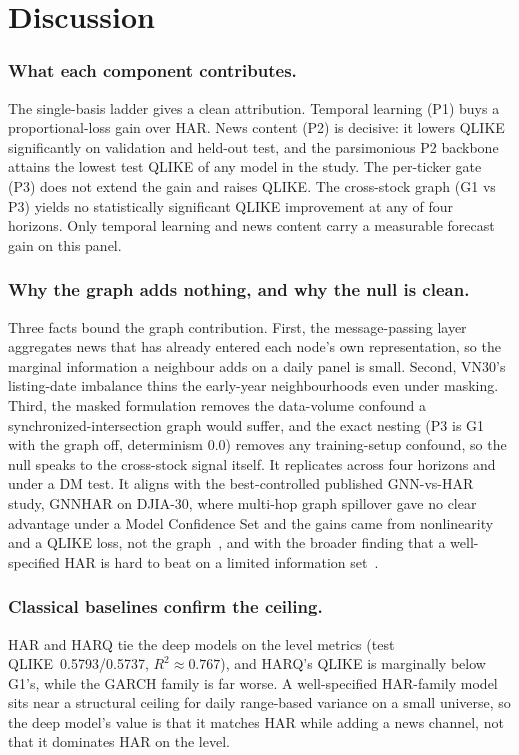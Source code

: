 \documentclass[runningheads]{llncs}
\newcommand{\HARtestQ}{0.5793}   %
\newcommand{\HARQtestQ}{0.5737}  %
\begin{document}
\section{Discussion}
\label{sec:discussion}

\subsubsection{What each component contributes.}
The single-basis ladder gives a clean attribution. Temporal learning (P1) buys a proportional-loss gain
over HAR. News content (P2) is decisive: it lowers QLIKE significantly on validation and held-out test,
and the parsimonious P2 backbone attains the lowest test QLIKE of any model in the study. The per-ticker
gate (P3) does not extend the gain and raises QLIKE. The cross-stock graph (G1 vs P3) yields no
statistically significant QLIKE improvement at any of four horizons. Only temporal learning and news
content carry a measurable forecast gain on this panel.

\subsubsection{Why the graph adds nothing, and why the null is clean.}
Three facts bound the graph contribution. First, the message-passing layer aggregates news that has
already entered each node's own representation, so the marginal information a neighbour adds on a daily
panel is small. Second, VN30's listing-date imbalance thins the early-year neighbourhoods even under
masking. Third, the masked formulation removes the data-volume confound a synchronized-intersection graph
would suffer, and the exact nesting (P3 is G1 with the graph off, determinism $0.0$) removes any
training-setup confound, so the null speaks to the cross-stock signal itself. It replicates across four
horizons and under a DM test. It aligns with the best-controlled published GNN-vs-HAR study, GNNHAR on
DJIA-30, where multi-hop graph spillover gave no clear advantage under a Model Confidence Set and the
gains came from nonlinearity and a QLIKE loss, not the graph~\cite{zhang2025gnnhar}, and with the broader
finding that a well-specified HAR is hard to beat on a limited information set~\cite{audrino2025}.

\subsubsection{Classical baselines confirm the ceiling.}
HAR and HARQ tie the deep models on the level metrics (test QLIKE~\HARtestQ/\HARQtestQ, $R^2\approx0.767$),
and HARQ's QLIKE is marginally below G1's, while the GARCH family is far worse. A well-specified HAR-family
model sits near a structural ceiling for daily range-based variance on a small universe, so the deep
model's value is that it matches HAR while adding a news channel, not that it dominates HAR on the level.
\end{document}

